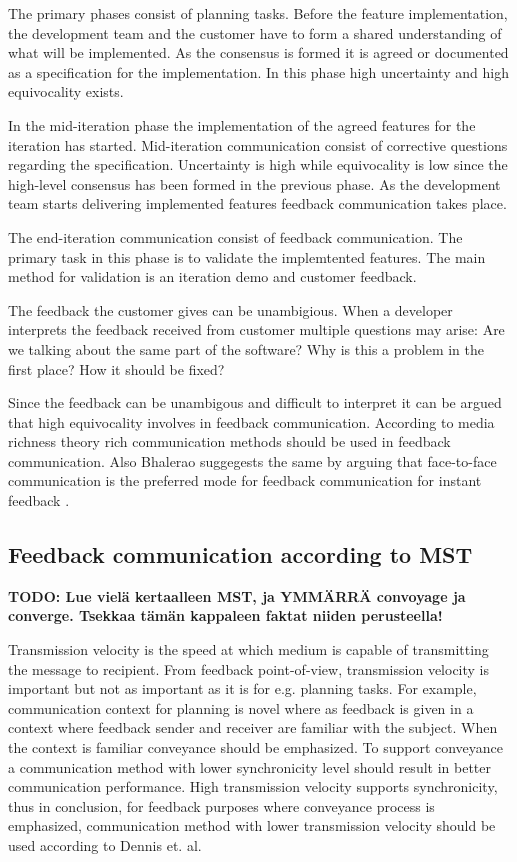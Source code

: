\documentclass[conference]{IEEEtran}
\begin{document}
The primary phases consist of planning tasks. Before the feature implementation, the development team and the customer have to form a shared understanding of what will be implemented. As the consensus is formed it is agreed or documented as a specification for the implementation. In this phase high uncertainty and high equivocality exists. 

In the mid-iteration phase the implementation of the agreed features for the iteration has started. Mid-iteration communication consist of corrective questions regarding the specification. Uncertainty is high while equivocality is low since the high-level consensus has been formed in the previous phase. As the development team starts delivering implemented features feedback communication takes place.

The end-iteration communication consist of feedback communication. The primary task in this phase is to validate the implemtented features. The main method for validation is an iteration demo and customer feedback.

The feedback the customer gives can be unambigious. When a developer interprets the feedback received from customer multiple questions may arise: Are we talking about the same part of the software? Why is this a problem in the first place? How it should be fixed?

Since the feedback can be unambigous and difficult to interpret it can be argued that high equivocality involves in feedback communication. According to media richness theory rich communication methods should be used in feedback communication. Also Bhalerao suggegests the same by arguing that face-to-face communication is the preferred mode for feedback communication for instant feedback \cite{2010bhalerao}. 

\subsection{Feedback communication according to MST}

\textbf{TODO: Lue vielä kertaalleen MST, ja YMMÄRRÄ convoyage ja converge. Tsekkaa tämän kappaleen faktat niiden perusteella!}

Transmission velocity is the speed at which medium is capable of transmitting the message to recipient. From feedback point-of-view, transmission velocity is important but not as important as it is for e.g. planning tasks. For example, communication context for planning is novel where as feedback is given in a context where feedback sender and receiver are familiar with the subject. When the context is familiar conveyance should be emphasized. To support conveyance a communication method with lower synchronicity level should result in better communication performance. High transmission velocity supports synchronicity, thus in conclusion, for feedback purposes where conveyance process is emphasized, communication method with lower transmission velocity should be used according to Dennis et. al. \cite{2008dennis}
\end{document}
